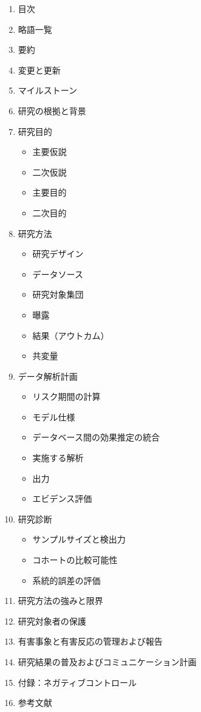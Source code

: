 \documentclass[
  11pt]{book}
\providecommand{\tightlist}{%
  \setlength{\itemsep}{0pt}\setlength{\parskip}{0pt}}
\theoremstyle{definition}
\theoremstyle{definition}
\theoremstyle{definition}
\theoremstyle{definition}
\theoremstyle{remark}
\begin{document}
\begin{enumerate}
\def\labelenumi{\arabic{enumi}.}
\tightlist
\item
  目次
\item
  略語一覧
\item
  要約
\item
  変更と更新
\item
  マイルストーン
\item
  研究の根拠と背景
\item
  研究目的

  \begin{itemize}
  \tightlist
  \item
    主要仮説
  \item
    二次仮説
  \item
    主要目的
  \item
    二次目的
  \end{itemize}
\item
  研究方法

  \begin{itemize}
  \tightlist
  \item
    研究デザイン
  \item
    データソース
  \item
    研究対象集団
  \item
    曝露
  \item
    結果（アウトカム）
  \item
    共変量
  \end{itemize}
\item
  データ解析計画

  \begin{itemize}
  \tightlist
  \item
    リスク期間の計算
  \item
    モデル仕様
  \item
    データベース間の効果推定の統合
  \item
    実施する解析
  \item
    出力
  \item
    エビデンス評価
  \end{itemize}
\item
  研究診断

  \begin{itemize}
  \tightlist
  \item
    サンプルサイズと検出力
  \item
    コホートの比較可能性
  \item
    系統的誤差の評価
  \end{itemize}
\item
  研究方法の強みと限界
\item
  研究対象者の保護
\item
  有害事象と有害反応の管理および報告
\item
  研究結果の普及およびコミュニケーション計画
\item
  付録：ネガティブコントロール
\item
  参考文献
\end{enumerate}
\end{document}
